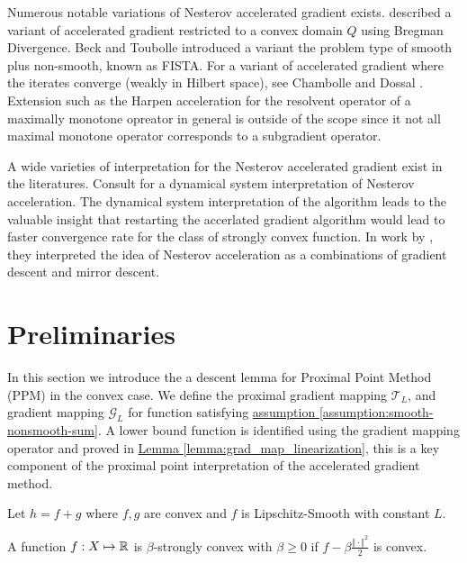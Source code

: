 \documentclass[12pt]{article}
\begin{document}
    \par
    Numerous notable variations of Nesterov accelerated gradient exists. \cite[(6.1.19)]{nesterov_lectures_2018} described a variant of accelerated gradient restricted to a convex domain $Q$ using Bregman Divergence. 
    Beck and Toubolle \cite{beck_fast_2009} introduced a variant the problem type of smooth plus non-smooth, known as FISTA. 
    For a variant of accelerated gradient where the iterates converge (weakly in Hilbert space), see Chambolle and Dossal \cite{chambolle_convergence_2015}. 
    Extension such as the Harpen acceleration for the resolvent operator of a maximally monotone opreator in general is outside of the scope since it not all maximal monotone operator corresponds to a subgradient operator. 
    \par
    A wide varieties of interpretation for the Nesterov accelerated gradient exist in the literatures. 
    Consult \cite{su_differential_2015} for a dynamical system interpretation of Nesterov acceleration. 
    The dynamical system interpretation of the algorithm leads to the valuable insight that restarting the accerlated gradient algorithm would lead to faster convergence rate for the class of strongly convex function. 
    In work by \cite{allen-zhu_linear_2016}, they interpreted the idea of Nesterov acceleration as a combinations of gradient descent and mirror descent. 

    
\section{Preliminaries}\label{sec:preliminaries}
    In this section we introduce the a descent lemma for Proximal Point Method (PPM) in the convex case. 
    We define the proximal gradient mapping $\mathcal T_L$, and gradient mapping $\mathcal G_L$ for function satisfying 
    \hyperref[assumption:smooth-nonsmooth-sum]
    {assumption \ref*{assumption:smooth-nonsmooth-sum}}. 
    A lower bound function is identified using the gradient mapping operator and proved in
    \hyperref[lemma:grad_map_linearization]{Lemma \ref*{lemma:grad_map_linearization}}, 
    this is a key component of the proximal point interpretation of the accelerated gradient method. 
    \begin{assumption}\label{assumption:smooth-nonsmooth-sum}
        Let $h = f + g$ where $f, g$ are convex and $f$ is Lipschitz-Smooth with constant $L$. 
    \end{assumption}
    \begin{definition}
        A function $f: X \mapsto \mathbb R$ is $\beta$-strongly convex
        with $\beta\geq 0$ if $f - \beta \frac{\Vert \cdot\Vert^2}{2}$ is convex.
    \end{definition}
\end{document}
